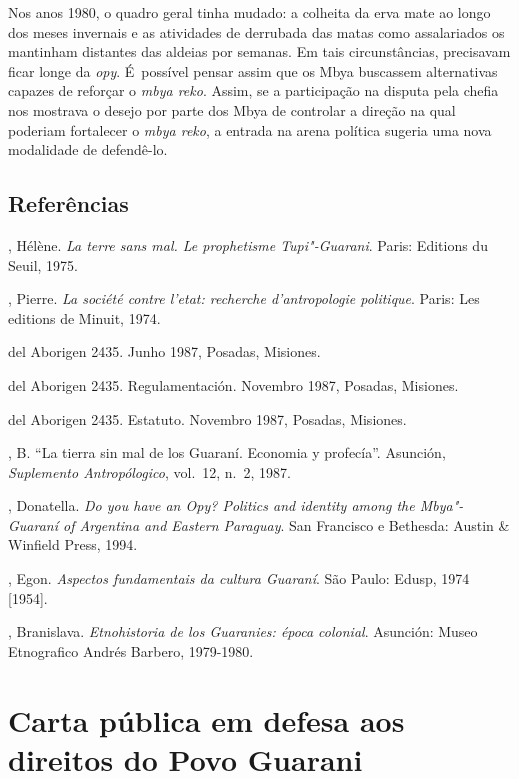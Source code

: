 Nos anos 1980, o quadro geral tinha mudado: a colheita da erva mate ao
longo dos meses invernais e as atividades de derrubada das matas como
assalariados os mantinham distantes das aldeias por semanas. Em tais
circunstâncias, precisavam ficar longe da \emph{opy}. É~possível pensar assim
que os Mbya buscassem alternativas capazes de reforçar o \emph{mbya reko}.
Assim, se a participação na disputa pela chefia nos mostrava o desejo
por parte dos Mbya de controlar a direção na qual poderiam fortalecer o
\emph{mbya reko}, a entrada na arena política sugeria uma nova modalidade de
defendê-lo. 

\section{Referências}

\begin{Parskip}
, Hélène. \emph{La terre sans mal. Le prophetisme Tupi"-Guarani}. Paris:
Editions du Seuil, 1975.

, Pierre. \emph{La société contre l’etat: recherche d’antropologie
politique}. Paris: Les editions de Minuit, 1974.

 del Aborigen 2435. Junho 1987, Posadas, Misiones.

 del Aborigen 2435. Regulamentación. Novembro 1987, Posadas,
Misiones.

 del Aborigen 2435. Estatuto. Novembro 1987, Posadas, Misiones.

, B. ``La tierra sin mal de los Guaraní. Economia y profecía''.
Asunción, \emph{Suplemento Antropólogico}, vol.~12, n.~2, 1987.

, Donatella. \emph{Do you have an \emph{Opy}? Politics and identity among the
Mbya"-Guaraní of Argentina and Eastern Paraguay}. San Francisco e
Bethesda: Austin \& Winfield Press, 1994.

, Egon. \emph{Aspectos fundamentais da cultura Guaraní}. São Paulo:
Edusp, 1974 [1954].

, Branislava. \emph{Etnohistoria de los Guaranies: época colonial}.
Asunción: Museo Etnografico Andrés Barbero, 1979-1980.
\end{Parskip}

\chapter{Carta pública em defesa aos direitos do Povo Guarani}

